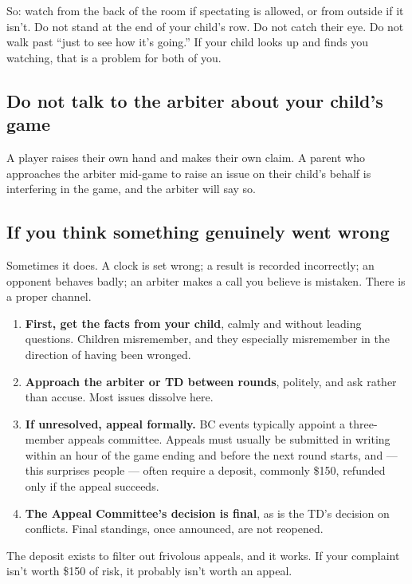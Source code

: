 \documentclass[10pt,letterpaper]{article}
\begin{document}
So: watch from the back of the room if spectating is allowed, or from outside if
it isn't. Do not stand at the end of your child's row. Do not catch their eye. Do
not walk past ``just to see how it's going.'' If your child looks up and finds
you watching, that is a problem for both of you.

\subsection{Do not talk to the arbiter about your child's game}

A player raises their own hand and makes their own claim. A parent who
approaches the arbiter mid-game to raise an issue on their child's behalf is
interfering in the game, and the arbiter will say so.

\subsection{If you think something genuinely went wrong}

Sometimes it does. A clock is set wrong; a result is recorded incorrectly; an
opponent behaves badly; an arbiter makes a call you believe is mistaken. There
is a proper channel.

\begin{enumerate}
  \item \textbf{First, get the facts from your child}, calmly and without
        leading questions. Children misremember, and they especially misremember
        in the direction of having been wronged.
  \item \textbf{Approach the arbiter or TD between rounds}, politely, and ask
        rather than accuse. Most issues dissolve here.
  \item \textbf{If unresolved, appeal formally.} BC events typically appoint a
        three-member appeals committee. Appeals must usually be submitted in
        writing within an hour of the game ending and before the next round
        starts, and --- this surprises people --- often require a deposit,
        commonly \$150, refunded only if the appeal succeeds.
  \item \textbf{The Appeal Committee’s decision is final}, as is the TD's decision on
        conflicts. Final standings, once announced, are not reopened.
\end{enumerate}

The deposit exists to filter out frivolous appeals, and it works. If your
complaint isn't worth \$150 of risk, it probably isn't worth an appeal.
\end{document}
